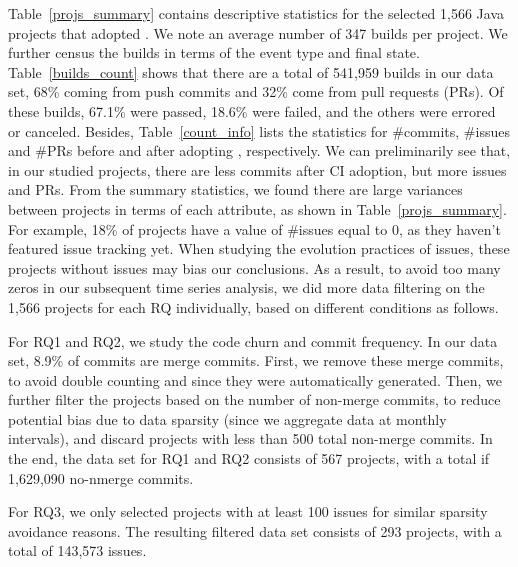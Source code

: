 Table~\ref{projs_summary} contains descriptive statistics for the selected 
1,566 Java projects that adopted \Tvis. 
We note an average number of 347 builds per project. 
We further census the builds in terms of the event type and final state. 
Table~\ref{builds_count} shows that there are a total of 541,959 builds in 
our data set, 68\% coming from push commits and 32\% come from pull 
requests (PRs). 
Of these builds, 67.1\% were passed, 18.6\% were failed, and the others 
were errored or canceled. 
Besides, Table~\ref{count_info} lists the statistics for \#commits, \#issues 
and \#PRs before and after adopting \Tvis, respectively. 
We can preliminarily see that, in our studied projects, there are less commits 
after CI adoption, but more issues and PRs. 
From the summary statistics, we found there are large variances between 
projects in terms of each attribute, as shown in Table~\ref{projs_summary}. 
For example, 18\% of projects have a value of \#issues equal to 0, as they 
haven't featured \GH issue tracking yet. 
When studying the evolution practices of issues, these projects without 
issues may bias our conclusions. 
As a result, to avoid too many zeros in our subsequent time series analysis, 
we did more data filtering on the 1,566 projects for each RQ individually, 
based on different conditions as follows.

For RQ1 and RQ2, we study the code churn and commit frequency. 
In our data set, 8.9\% of commits are merge commits. 
First, we remove these merge commits, to avoid double counting and since 
they were automatically generated. 
Then, we further filter the projects based on the number of non-merge commits,
to reduce potential bias due to data sparsity (since we aggregate data at 
monthly intervals), and discard projects with less than 500 total non-merge 
commits.
In the end, the data set for RQ1 and RQ2 consists of 567 projects, with a 
total if 1,629,090 no-nmerge commits.

For RQ3, we only selected projects with at least 100 issues for similar sparsity 
avoidance reasons. 
The resulting filtered data set consists of 293 projects, with a total of 143,573 
\GH issues.

